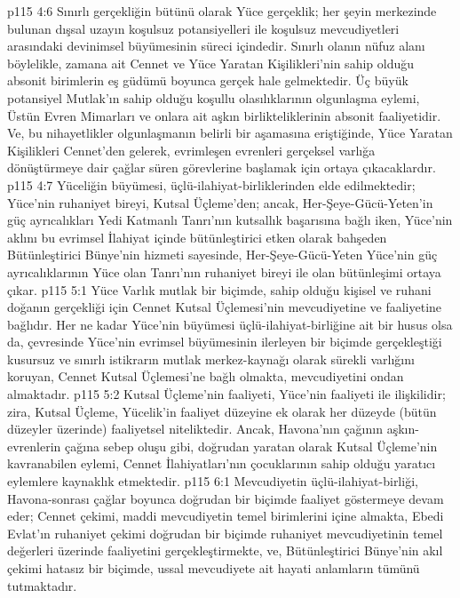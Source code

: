 \vs p115 4:6 Sınırlı gerçekliğin bütünü olarak Yüce gerçeklik; her şeyin merkezinde bulunan dışsal uzayın koşulsuz potansiyelleri ile koşulsuz mevcudiyetleri arasındaki devinimsel büyümesinin süreci içindedir. Sınırlı olanın nüfuz alanı böylelikle, zamana ait Cennet ve Yüce Yaratan Kişilikleri’nin sahip olduğu absonit birimlerin eş güdümü boyunca gerçek hale gelmektedir. Üç büyük potansiyel Mutlak’ın sahip olduğu koşullu olasılıklarının olgunlaşma eylemi, Üstün Evren Mimarları ve onlara ait aşkın birlikteliklerinin absonit faaliyetidir. Ve, bu nihayetlikler olgunlaşmanın belirli bir aşamasına eriştiğinde, Yüce Yaratan Kişilikleri Cennet’den gelerek, evrimleşen evrenleri gerçeksel varlığa dönüştürmeye dair çağlar süren görevlerine başlamak için ortaya çıkacaklardır.
\vs p115 4:7 Yüceliğin büyümesi, üçlü\hyp{}ilahiyat\hyp{}birliklerinden elde edilmektedir; Yüce’nin ruhaniyet bireyi, Kutsal Üçleme’den; ancak, Her\hyp{}Şeye\hyp{}Gücü\hyp{}Yeten’in güç ayrıcalıkları Yedi Katmanlı Tanrı’nın kutsallık başarısına bağlı iken, Yüce’nin aklını bu evrimsel İlahiyat içinde bütünleştirici etken olarak bahşeden Bütünleştirici Bünye’nin hizmeti sayesinde, Her\hyp{}Şeye\hyp{}Gücü\hyp{}Yeten Yüce’nin güç ayrıcalıklarının Yüce olan Tanrı’nın ruhaniyet bireyi ile olan bütünleşimi ortaya çıkar.
\vs p115 5:1 Yüce Varlık mutlak bir biçimde, sahip olduğu kişisel ve ruhani doğanın gerçekliği için Cennet Kutsal Üçlemesi’nin mevcudiyetine ve faaliyetine bağlıdır. Her ne kadar Yüce’nin büyümesi üçlü\hyp{}ilahiyat\hyp{}birliğine ait bir husus olsa da, çevresinde Yüce’nin evrimsel büyümesinin ilerleyen bir biçimde gerçekleştiği kusursuz ve sınırlı istikrarın mutlak merkez\hyp{}kaynağı olarak sürekli varlığını koruyan, Cennet Kutsal Üçlemesi’ne bağlı olmakta, mevcudiyetini ondan almaktadır.
\vs p115 5:2 Kutsal Üçleme’nin faaliyeti, Yüce’nin faaliyeti ile ilişkilidir; zira, Kutsal Üçleme, Yücelik’in faaliyet düzeyine ek olarak her düzeyde (bütün düzeyler üzerinde) faaliyetsel niteliktedir. Ancak, Havona’nın çağının aşkın\hyp{}evrenlerin çağına sebep oluşu gibi, doğrudan yaratan olarak Kutsal Üçleme’nin kavranabilen eylemi, Cennet İlahiyatları’nın çocuklarının sahip olduğu yaratıcı eylemlere kaynaklık etmektedir.
\vs p115 6:1 Mevcudiyetin üçlü\hyp{}ilahiyat\hyp{}birliği, Havona\hyp{}sonrası çağlar boyunca doğrudan bir biçimde faaliyet göstermeye devam eder; Cennet çekimi, maddi mevcudiyetin temel birimlerini içine almakta, Ebedi Evlat’ın ruhaniyet çekimi doğrudan bir biçimde ruhaniyet mevcudiyetinin temel değerleri üzerinde faaliyetini gerçekleştirmekte, ve, Bütünleştirici Bünye’nin akıl çekimi hatasız bir biçimde, ussal mevcudiyete ait hayati anlamların tümünü tutmaktadır.
